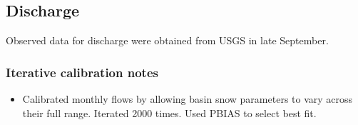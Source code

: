 \subsection{Discharge}
Observed data for discharge were obtained from USGS in late September.

\subsubsection{Iterative calibration notes}
\begin{itemize}
	\item Calibrated monthly flows by allowing basin snow parameters to vary across their full range. Iterated 2000 times. Used PBIAS to select best fit.
\end{itemize}
\pagebreak
